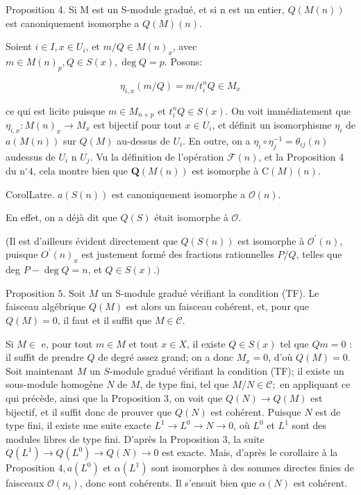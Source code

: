 Proposition 4. Si M est un S-module gradué, et si n est un entier, $Q(M(n))$ est canoniquement isomorphe a $Q(M)(n)$.

Soient $i \in I, x \in U_{i}$, et $m / Q \in M(n)_{x}$, avec $m \in M(n)_{p}, Q \in S(x), \operatorname{deg} Q=p$. Posons:

$$
\eta_{i, x}(m / Q)=m / t_{i}^{n} Q \in M_{x}
$$

ce qui est licite puisque $m \in M_{n+p}$ et $t_{i}^{n} Q \in S(x) .$ On voit immédiatement que $\eta_{i, x}: M(n)_{x} \rightarrow M_{x}$ est bijectif pour tout $x \in U_{i}$, et définit un isomorphisme $\eta_{i}$ de $a(M(n))$ sur $Q(M)$ au-dessus de $U_{i} .$ En outre, on a $\eta_{i} \circ \eta_{j}^{-1}=\theta_{i j}(n)$ audessus de $U_{i}$ n $U_{j} .$ Vu la définition de l'opération $\mathcal{F}(n)$, et la Proposition 4 du $\mathrm{n}^{\circ} 4$, cela montre bien que $\boldsymbol{Q}(M(n))$ est isomorphe à $\mathrm{C}(M)(n)$.

CorolLatre. $a(S(n))$ est canoniquement isomorphe a $\mathcal{O}(n)$.

En effet, on a déjà dit que $Q(S)$ était isomorphe à $\mathcal{O}$.

(Il est d'ailleurs évident directement que $Q(S(n))$ est isomorphe à $\mathcal{O}^{\prime}(n)$, puisque ${O}^{\prime}(n)_{x}$ est justement formé des fractions rationnelles $P / Q$, telles que deg $P-\operatorname{deg} Q=n$, et $Q \in S(x) .)$

Proposition $5 .$ Soit $M$ un S-module gradué vérifiant la condition (TF). Le faisceau algébrique $Q(M)$ est alors un faisceau cohérent, et, pour que $Q(M)=0$, il faut et il suffit que $M \in \mathcal{C}$.

Si $M \in$ e, pour tout $m \in M$ et tout $x \in X$, il existe $Q \in S(x)$ tel que $Q m=0$ : il suffit de prendre $Q$ de degré assez grand; on a donc $M_{x}=0$, d'où $Q(M)=0$. Soit maintenant $M$ un $S$-module gradué vérifiant la condition (TF); il existe un sous-module homogène $N$ de $M$, de type fini, tel que $M / N \in \mathcal{C} ;$ en appliquant ce qui précède, ainsi que la Proposition 3, on voit que $Q(N) \rightarrow Q(M)$ est bijectif, et il suffit donc de prouver que $Q(N)$ est cohérent. Puisque $N$ est de type fini, il existe une suite exacte $L^{1} \rightarrow L^{0} \rightarrow N \rightarrow 0$, où $L^{0}$ et $L^{1}$ sont des modules libres de type fini. D'après la Proposition 3, la suite $Q\left(L^{1}\right) \rightarrow Q\left(L^{0}\right) \rightarrow Q(N) \rightarrow 0$ est exacte. Mais, d'après le corollaire à la Proposition $4, a\left(L^{0}\right)$ et $\alpha\left(L^{1}\right)$ sont isomorphes à des sommes directes finies de faisceaux $\mathcal{O}\left(n_{i}\right)$, donc sont cohérents. Il s'ensuit bien que $\alpha(N)$ est cohérent.

